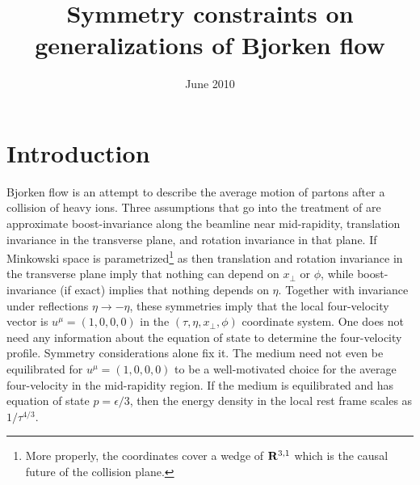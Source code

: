 \documentclass[12pt]{article}
\begin{document}


\title{Symmetry constraints on generalizations of Bjorken flow}



\date{June 2010}

\maketitle

\tableofcontents

\section{Introduction}

Bjorken flow \cite{Bjorken:1982qr} is an attempt to describe the average motion of partons after a collision of heavy ions.  Three assumptions that go into the treatment of \cite{Bjorken:1982qr} are approximate boost-invariance along the beamline near mid-rapidity, translation invariance in the transverse plane, and rotation invariance in that plane.  If Minkowski space is parametrized\footnote{More properly, the coordinates  cover a wedge of ${\bf R}^{3,1}$ which is the causal future of the collision plane.} as
then translation and rotation invariance in the transverse plane imply that nothing can depend on $x_\perp$ or $\phi$, while boost-invariance (if exact) implies that nothing depends on $\eta$.  Together with invariance under reflections $\eta \to -\eta$, these symmetries imply that the local four-velocity vector is $u^\mu = (1,0,0,0)$ in the $(\tau,\eta,x_\perp,\phi)$ coordinate system.  One does not need any information about the equation of state to determine the four-velocity profile.  Symmetry considerations alone fix it.  The medium need not even be equilibrated for $u^\mu = (1,0,0,0)$ to be a well-motivated choice for the average four-velocity in the mid-rapidity region.  If the medium is equilibrated and has equation of state $p = \epsilon/3$, then the energy density in the local rest frame scales as $1/\tau^{4/3}$.
\end{document}
